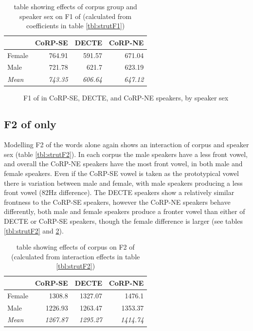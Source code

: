 \documentclass[../../../00.FullDoc/tex/APRReport-year4]{subfiles}
\begin{document}
\begin{table}[htbp]
	\centering
	\begin{tabular}{lrrr}
		\hline
		& \multicolumn{1}{l}{CoRP-SE} & \multicolumn{1}{l}{DECTE} & \multicolumn{1}{l}{CoRP-NE} \\
		\hline
		Female & 764.91 & 591.57 & 671.04 \\
		Male  & 721.78 & 621.7 & 623.19 \\
		\textit{Mean} & \textit{743.35} & \textit{606.64} & \textit{647.12} \\
		\hline
	\end{tabular}%
	\caption{table showing effects of corpus group and speaker sex on F1 of \strutt{} (calculated from coefficients in table \ref{tbl:strutF1})}
	\label{tbl:strutF1inter}%
\end{table}%

\begin{figure}[h]
	
	\caption{F1 of \strutt{} in CoRP-SE, DECTE, and CoRP-NE speakers, by speaker sex} \label{fig:strutF1-sex}
\end{figure}


\subsection{F2 of  only}
Modelling F2 of the \strutt{} words alone again shows an interaction of corpus and speaker sex (table \ref{tbl:strutF2}). In each corpus the male speakers have a less front vowel, and overall the CoRP-NE speakers have the most front vowel, in both male and female speakers. Even if the CoRP-SE vowel is taken as the prototypical \strutt{} vowel there is variation between male and female, with male speakers producing a less front vowel (82Hz difference). The DECTE speakers show a relatively similar frontness to the CoRP-SE speakers, however the CoRP-NE speakers behave differently, both male and female speakers produce a fronter \strutt{} vowel than either of DECTE or CoRP-SE speakers, though the female difference is larger (see tables \ref{tbl:strutF2} and \ref{tbl:strutF2-inter}).


\begin{table}[htbp]
	\centering
	\begin{tabular}{lrrr}
		\hline
		& \multicolumn{1}{l}{CoRP-SE} & \multicolumn{1}{l}{DECTE} & \multicolumn{1}{l}{CoRP-NE} \\
		\hline
		Female & 1308.8 & 1327.07 & 1476.1 \\
		Male  & 1226.93 & 1263.47 & 1353.37 \\
		\textit{Mean} & \textit{1267.87} & \textit{1295.27} & \textit{1414.74} \\
		\hline
	\end{tabular}%
	\caption{table showing effects of corpus on F2 of \strutt{} (calculated from interaction effects in table \ref{tbl:strutF2})}
	\label{tbl:strutF2-inter}%
\end{table}%
\end{document}
